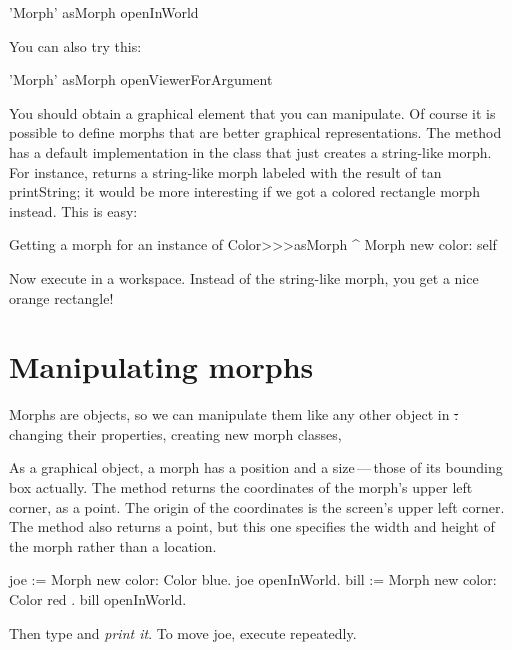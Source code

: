 \documentclass[a4paper,10pt,twoside]{book}
\begin{document}
\begin{code}{}
'Morph' asMorph openInWorld
\end{code}

You can also try this:
\begin{code}{}
'Morph' asMorph openViewerForArgument
\end{code}

You should obtain a graphical element that you can manipulate.
Of course it is possible to define morphs that are better graphical representations.
The method  has a default implementation in the  class that just creates a string-like morph.
For instance,  returns a string-like morph labeled with the result of  {tan printString}; it would be more interesting if we got a colored rectangle morph instead.
This is easy:

\begin{method}{Getting a morph for an instance of }
Color>>>asMorph
   ^ Morph new color: self
\end{method}
\noindent
Now execute   in a workspace. Instead of the string-like morph, you get a nice orange rectangle!


\section{Manipulating morphs}

Morphs are objects, so we can manipulate them like any other object in \st: changing their properties, creating new morph classes, \etc

As a graphical object, a morph has a position and a size\,---\,those of its bounding box actually.
The  method returns the coordinates of the morph's upper left corner, as a point.
The origin of the coordinates is the screen's upper left corner.
The  method also returns a point, but this one specifies the width and height of the morph rather than a location.

\begin{code}{}
joe := Morph new color: Color blue.
joe openInWorld.
bill := Morph new color: Color red .
bill openInWorld.
\end{code}
\noindent
Then type  and \emph{print it}.
To move joe, execute  repeatedly.
\end{document}
